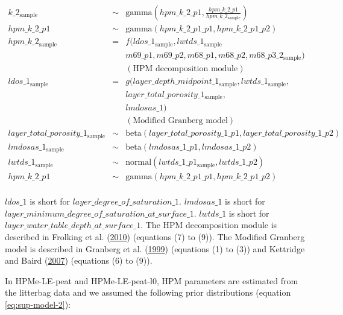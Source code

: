 \documentclass[
  12pt,
]{article}
\begin{document}
\begin{equation}
\begin{aligned}
k\_2_{\text{sample}} & \sim & \text{gamma}\left(hpm\_k\_2\_p1, \frac{hpm\_k\_2\_p1}{hpm\_k\_2_{\text{sample}}} \right)\\
hpm\_k\_2\_p1 & \sim & \text{gamma}(hpm\_k\_2\_p1\_p1, hpm\_k\_2\_p1\_p2)\\
hpm\_k\_2_{\text{sample}} & = & f(ldos\_1_{\text{sample}}, lwtds\_1_{\text{sample}}\\
          && m69\_p1, m69\_p2, m68\_p1, m68\_p2, m68\_p3\_2_{\text{sample}})\\
          && (\text{HPM decomposition module})\\
ldos\_1_{\text{sample}} & = & g(layer\_depth\_midpoint\_1_{\text{sample}},
        lwtds\_1_{\text{sample}},\\
          && layer\_total\_porosity\_1_{\text{sample}},\\
          && lmdosas\_1)\\
          && (\text{Modified Granberg model})\\
layer\_total\_porosity\_1_{\text{sample}} & \sim & \text{beta}(layer\_total\_porosity\_1\_p1, layer\_total\_porosity\_1\_p2)\\
lmdosas\_1_{\text{sample}} & \sim & \text{beta}(lmdosas\_1\_p1, lmdosas\_1\_p2)\\
lwtds\_1_{\text{sample}} & \sim & \text{normal}(lwtds\_1\_p1_{\text{sample}}, lwtds\_1\_p2)\\
hpm\_k\_2\_p1 & \sim & \text{gamma}(hpm\_k\_2\_p1\_p1, hpm\_k\_2\_p1\_p2)\\
\label{eq:sup-model-1}
\end{aligned}
\end{equation}

\(ldos\_1\) is short for \(layer\_degree\_of\_saturation\_1\). \(lmdosas\_1\) is short for \(layer\_minimum\_degree\_of\_saturation\_at\_surface\_1\). \(lwtds\_1\) is short for \(layer\_water\_table\_depth\_at\_surface\_1\). The HPM decomposition module is described in Frolking et al. (\protect\hyperlink{ref-Frolking.2010}{2010}) (equations (7) to (9)). The Modified Granberg model is described in Granberg et al. (\protect\hyperlink{ref-Granberg.1999}{1999}) (equations (1) to (3)) and Kettridge and Baird (\protect\hyperlink{ref-Kettridge.2007}{2007}) (equations (6) to (9)).

In HPMe-LE-peat and HPMe-LE-peat-l0, HPM parameters are estimated from the litterbag data and we assumed the following prior distributions (equation \eqref{eq:sup-model-2}):
\end{document}
